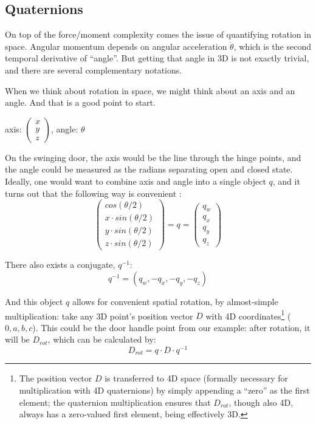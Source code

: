 \documentclass[10pt,a4paper]{article}
\begin{document}
\subsection{Quaternions}
\label{sec:org31792f5}
On top of the force/moment complexity comes the issue of quantifying rotation in space.
Angular momentum depends on angular acceleration \(\ddot\theta\), which is the second temporal derivative of ``angle''.
But getting that angle in 3D is not exactly trivial, and there are several complementary notations.


When we think about rotation in space, we might think about an axis and an angle.
And that is a good point to start.

\begin{center}
axis: \(\begin{pmatrix}x\\y\\z \end{pmatrix}\), angle: \(\theta\)
\end{center}

On the swinging door, the axis would be the line through the hinge points, and the angle could be measured as the radians separating open and closed state.
Ideally, one would want to combine axis and angle into a single object \(q\), and it turns out that the following way is convenient \citep{Pennestri2010,Challis2020,Flashner2019}:
\begin{equation}\label{eqn:quaternion}
\begin{pmatrix}cos(\theta/2)\\x\cdot sin(\theta/2)\\y\cdot sin(\theta/2)\\z\cdot sin(\theta/2) \end{pmatrix} = q = \begin{pmatrix}q_w\\q_x\\q_y\\q_z \end{pmatrix}
\end{equation}

There also exists a conjugate, \(q^{-1}\):
\[q^{-1} = (q_w, -q_x, -q_y, -q_z)\]


And this object \(q\) allows for convenient spatial rotation, by almost-simple multiplication:
take any 3D point's position vector \(D\) with 4D coordinates\footnote{The position vector \(D\) is transferred to 4D space (formally necessary for multiplication with 4D quaternions) by simply appending a ``zero'' as the first element; the quaternion multiplication ensures that \(D_{rot}\), though also 4D, always has a zero-valued first element, being effectively 3D.} (\(0, a, b, c\)).
This could be the door handle point from our example: after rotation, it will be \(D_{rot}\), which can be calculated by:
\[D_{rot} = q\cdot D\cdot q^{-1}\]
\end{document}
